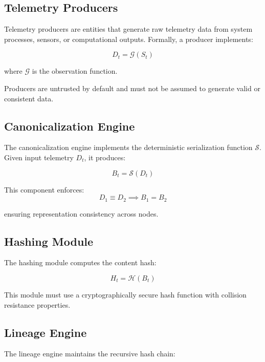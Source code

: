 \subsection{Telemetry Producers}

Telemetry producers are entities that generate raw telemetry data from system processes, sensors, or computational outputs. Formally, a producer implements:

\begin{equation}
D_t = \mathcal{G}(S_t)
\end{equation}

where $\mathcal{G}$ is the observation function.

Producers are untrusted by default and must not be assumed to generate valid or consistent data.

\subsection{Canonicalization Engine}

The canonicalization engine implements the deterministic serialization function $\mathcal{S}$. Given input telemetry $D_t$, it produces:

\begin{equation}
B_t = \mathcal{S}(D_t)
\end{equation}

This component enforces:
\begin{equation}
D_1 \equiv D_2 \implies B_1 = B_2
\end{equation}

ensuring representation consistency across nodes.

\subsection{Hashing Module}

The hashing module computes the content hash:

\begin{equation}
H_t = \mathcal{H}(B_t)
\end{equation}

This module must use a cryptographically secure hash function with collision resistance properties.

\subsection{Lineage Engine}

The lineage engine maintains the recursive hash chain:

